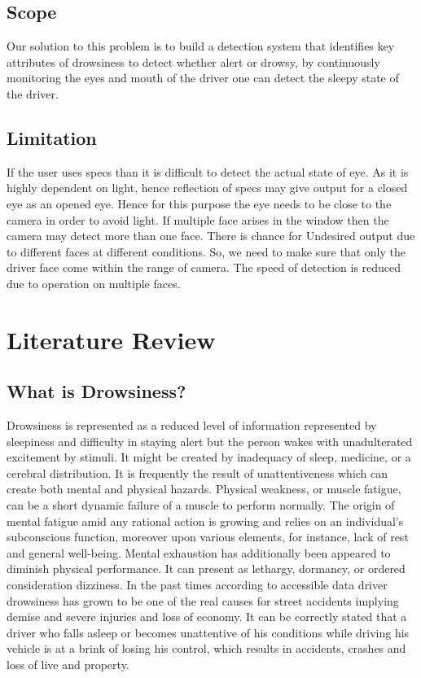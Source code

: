\documentclass{article}
\begin{document}
\subsection{Scope}
Our solution to this problem is to build a detection system that identiﬁes key attributes of drowsiness to detect whether alert or drowsy, by continuously monitoring the eyes and mouth of the driver one can detect the sleepy state of the driver.

\subsection{Limitation}
If the user uses specs than it is diﬃcult to detect the actual state of eye. As it is highly dependent on light, hence reﬂection of specs may give output for a closed eye as an opened eye. Hence for this purpose the eye needs to be close to the camera in order to avoid light. If multiple face arises in the window then the camera may detect more than one face. There is chance for Undesired output due to diﬀerent faces at diﬀerent conditions. So, we need to make sure that only the driver face come within the range of camera. The speed of detection is reduced due to operation on multiple faces.
\newpage

\section{Literature Review}
\subsection{What is Drowsiness?}
Drowsiness is represented as a reduced level of information represented by sleepiness and diﬃculty in staying alert but the person wakes with unadulterated excitement by stimuli. It might be created by inadequacy of sleep, medicine, or a cerebral distribution. It is frequently the result of unattentiveness which can create both mental and physical hazards. Physical weakness, or muscle fatigue, can be a  short dynamic failure of a muscle to perform normally. The origin of mental fatigue amid any rational action is growing and relies on an individual’s subconscious function, moreover upon various elements, for instance, lack of rest and general well-being. Mental exhaustion has additionally been appeared to diminish physical performance. It can present as lethargy, dormancy, or ordered consideration dizziness. 
In the past times according to accessible data driver drowsiness has grown to be one of the real causes for street accidents implying demise and severe injuries and loss of economy. It can be correctly stated that a driver who falls asleep or becomes unattentive of his conditions while driving his vehicle is at a brink of losing his control, which results in accidents, crashes and loss of live and property. 
\end{document}
